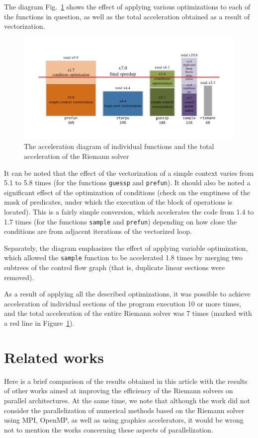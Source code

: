 \documentclass[utf8,english]{psta}%
\begin{document}
The diagram Fig.~\ref{pic:perf} shows the effect of applying various optimizations to each of the functions in question, as well as the total acceleration obtained as a result of vectorization.

\begin{figure}
\includegraphics[width=12cm]{pics/pic_perf_eng}
\caption{The acceleration diagram of individual functions and the total acceleration of the Riemann solver}
\label{pic:perf}
\end{figure}

It can be noted that the effect of the vectorization of a simple context varies from 5.1 to 5.8 times (for the functions \texttt{guessp} and \texttt{prefun}).
It should also be noted a significant effect of the optimization of conditions (check on the emptiness of the mask of predicates, under which the execution of the block of operations is located).
This is a fairly simple conversion, which accelerates the code from 1.4 to 1.7 times (for the functions \texttt{sample} and \texttt{prefun}) depending on how close the conditions are from adjacent iterations of the vectorized loop.

Separately, the diagram emphasizes the effect of applying variable optimization, which allowed the \texttt{sample} function to be accelerated 1.8 times by merging two subtrees of the control flow graph (that is, duplicate linear sections were removed).

As a result of applying all the described optimizations, it was possible to achieve acceleration of individual sections of the program execution 10 or more times, and the total acceleration of the entire Riemann solver was 7 times (marked with a red line in Figure~\ref{pic:perf}).

\section{Related works}

Here is a brief comparison of the results obtained in this article with the results of other works aimed at improving the efficiency of the Riemann solvers on parallel architectures.
At the same time, we note that although the work did not consider the parallelization of numerical methods based on the Riemann solver using MPI, OpenMP, as well as using graphics accelerators, it would be wrong not to mention the works concerning these aspects of parallelization.
\end{document}
